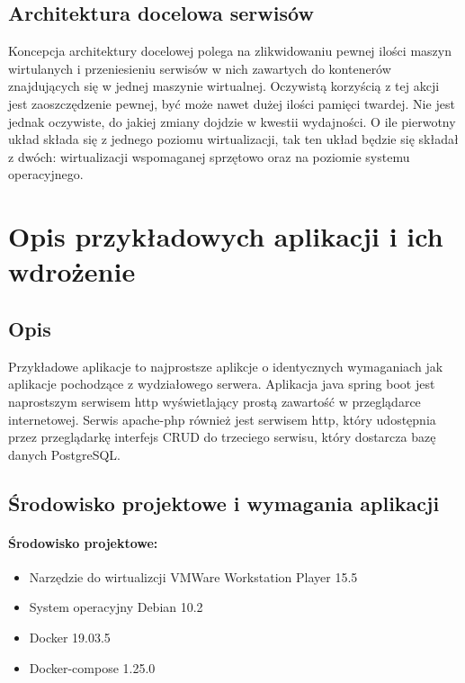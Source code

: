 \documentclass[polish, a4paper, 12pt, oneside]{book}
\begin{document}
\section{Architektura docelowa serwisów}
Koncepcja architektury docelowej polega na zlikwidowaniu pewnej ilości maszyn wirtulanych i przeniesieniu serwisów w nich zawartych do kontenerów znajdujących się w jednej maszynie wirtualnej. Oczywistą korzyścią z tej akcji jest zaoszczędzenie pewnej, być może nawet dużej ilości  pamięci twardej. Nie jest jednak oczywiste, do jakiej zmiany dojdzie w kwestii wydajności. O ile pierwotny układ składa się z jednego poziomu wirtualizacji, tak ten układ będzie się składał z dwóch: wirtualizacji wspomaganej sprzętowo oraz na poziomie systemu operacyjnego.

\chapter{Opis przykładowych aplikacji i ich wdrożenie}
\section{Opis}
Przykładowe aplikacje to najprostsze aplikcje o identycznych wymaganiach jak aplikacje pochodzące z wydziałowego serwera. Aplikacja java spring boot jest naprostszym serwisem http wyświetlający prostą zawartość w przeglądarce internetowej. Serwis apache-php również jest serwisem http, który udostępnia przez przeglądarkę interfejs CRUD do trzeciego serwisu, który dostarcza bazę danych PostgreSQL.  
\section{Środowisko projektowe i wymagania aplikacji}
\subsubsection{Środowisko projektowe:}
\begin{itemize}[noitemsep]
    \item Narzędzie do wirtualizcji VMWare Workstation Player 15.5
    \item System operacyjny Debian 10.2
    \item Docker 19.03.5
    \item Docker-compose 1.25.0
\end{itemize}
\end{document}
